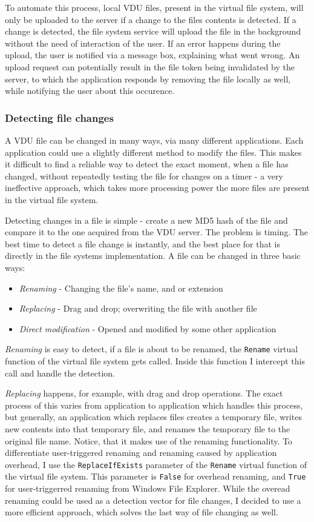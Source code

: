 To automate this process, local VDU files, present in the virtual file system, will only be uploaded to the server if a change to the files contents is detected. If a change is detected, the file system service will upload the file in the background without the need of interaction of the user. If an error happens during the upload, the user is notified via a message box, explaining what went wrong. An upload request can potentially result in the file token being invalidated by the server, to which the application responds by removing the file locally as well, while notifying the user about this occurence.

\subsubsection{Detecting file changes}
A VDU file can be changed in many ways, via many different applications. Each application could use a slightly different method to modify the files. This makes it difficult to find a reliable way to detect the exact moment, when a file has changed, without repeatedly testing the file for changes on a timer - a very ineffective approach, which takes more processing power the more files are present in the virtual file system.

Detecting changes in a file is simple - create a new MD5 hash of the file and compare it to the one acquired from the VDU server. The problem is timing. The best time to detect a file change is instantly, and the best place for that is directly in the file systems implementation. A file can be changed in three basic ways:
\begin{itemize}
    \item \textit{Renaming} - Changing the file's name, and or extension
    \item \textit{Replacing} - Drag and drop; overwriting the file with another file
    \item \textit{Direct modification} - Opened and modified by some other application
\end{itemize}


\textit{Renaming} is easy to detect, if a file is about to be renamed, the \lstinline{Rename} virtual function of the virtual file system gets called. Inside this function I intercept this call and handle the detection.

\textit{Replacing} happens, for example, with drag and drop operations. The exact process of this varies from application to application which handles this process, but generally, an application which replaces files creates a temporary file, writes new contents into that temporary file, and renames the temporary file to the original file name. Notice, that it makes use of the renaming functionality. To differentiate user-triggered renaming and renaming caused by application overhead, I use the \lstinline{ReplaceIfExists} parameter of the \lstinline{Rename} virtual function of the virtual file system. This parameter is \lstinline{False} for overhead renaming, and \lstinline{True} for user-triggerred renaming from Windows File Explorer. While the overead renaming could be used as a detection vector for file changes, I decided to use a more efficient approach, which solves the last way of file changing as well.

